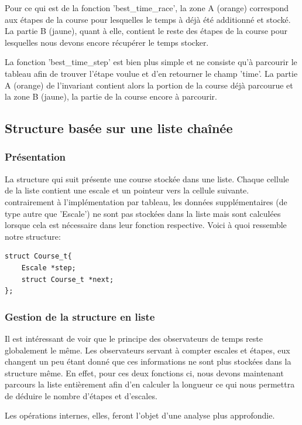 \documentclass[a4paper, 11pt, oneside]{article}
\begin{document}
\vspace{0.5cm}
Pour ce qui est de la fonction 'best\_time\_race', la zone A (orange)
correspond aux étapes de la course pour lesquelles le temps à déjà été
additionné et stocké. La partie B (jaune), quant à elle, contient le reste des
étapes de la course pour lesquelles nous devons encore récupérer le temps
stocker.

La fonction 'best\_time\_step' est bien plus simple et ne consiste qu'à
parcourir le tableau afin de trouver l'étape voulue et d'en retourner le champ
'time'. La partie A (orange) de l'invariant contient alors la portion de la
course déjà parcourue et la zone B (jaune), la partie de la course encore à
parcourir.

\subsection{Structure basée sur une liste chaînée}

\subsubsection{Présentation}
La structure qui suit présente une course stockée dans une liste. Chaque cellule de la liste contient une escale et un pointeur vers la cellule suivante. contrairement à l'implémentation par tableau, les données supplémentaires (de type autre que 'Escale') ne sont pas stockées dans la liste mais sont calculées lorsque cela est nécessaire dans leur fonction respective. Voici à quoi ressemble notre structure:

\begin{lstlisting}
struct Course_t{
    Escale *step;
    struct Course_t *next;
};
\end{lstlisting}

\subsubsection{Gestion de la structure en liste}

Il est intéressant de voir que le principe des observateurs de temps reste globalement le même. Les observateurs servant à compter escales et étapes, eux changent un peu étant donné que ces informations ne sont plus stockées dans la  structure même. En effet, pour ces deux fonctions ci, nous devons maintenant parcours la liste entièrement afin d'en calculer la longueur ce qui nous permettra de déduire le nombre d'étapes et d'escales.

Les opérations internes, elles, feront l'objet d'une analyse plus approfondie.
\end{document}
